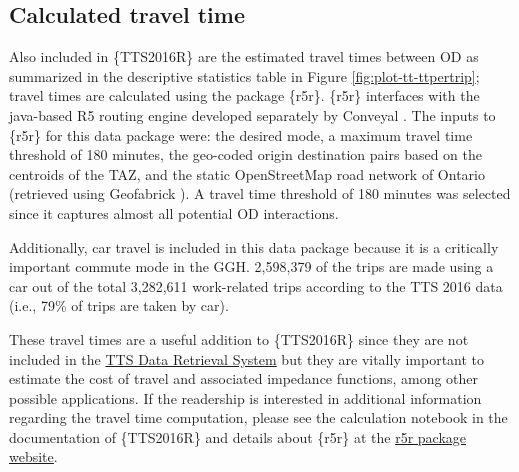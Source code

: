 \documentclass[Royal,times,sageh]{sagej}
\begin{document}
\hypertarget{calculated-travel-time}{%
\subsection{Calculated travel time}\label{calculated-travel-time}}

Also included in \{TTS2016R\} are the estimated travel times between OD
as summarized in the descriptive statistics table in Figure
\ref{fig:plot-tt-ttpertrip}; travel times are calculated using the
package \{r5r\}. \{r5r\} interfaces with the java-based R5 routing
engine developed separately by Conveyal
\citep{conveyalConveyalR5Routing2022}. The inputs to \{r5r\} for this
data package were: the desired mode, a maximum travel time threshold of
180 minutes, the geo-coded origin destination pairs based on the
centroids of the TAZ, and the static OpenStreetMap road network of
Ontario (retrieved using Geofabrick
\citep{geofabrikOntarioOpenStreetMapGeofabrik2022}). A travel time
threshold of 180 minutes was selected since it captures almost all
potential OD interactions.

Additionally, car travel is included in this data package because it is
a critically important commute mode in the GGH. 2,598,379 of the trips
are made using a car out of the total 3,282,611 work-related trips
according to the TTS 2016 data (i.e., 79\% of trips are taken by car).

These travel times are a useful addition to \{TTS2016R\} since they are
not included in the \href{https://dmg.utoronto.ca/idrs/index}{TTS Data
Retrieval System} but they are vitally important to estimate the cost of
travel and associated impedance functions, among other possible
applications. If the readership is interested in additional information
regarding the travel time computation, please see the calculation
notebook in the documentation of \{TTS2016R\} and details about \{r5r\}
at the \href{https://ipeagit.github.io/r5r/index.html}{r5r package
website}.
\end{document}
